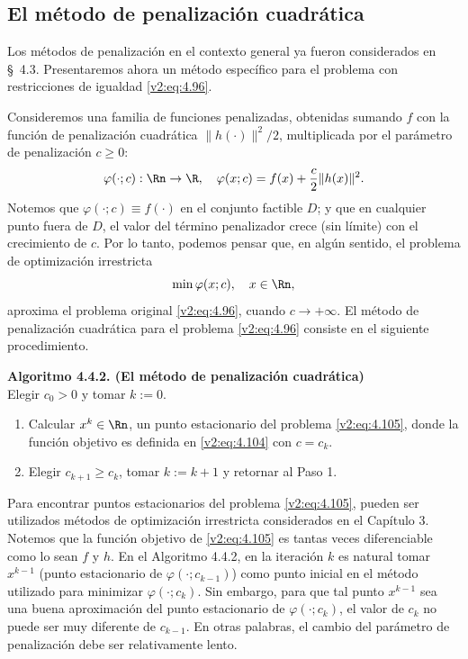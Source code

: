 \subsection{El método de penalización cuadrática}\label{v2:sec:4.4.2}

Los métodos de penalización en el contexto general ya fueron considerados en \S~4.3. Presentaremos ahora un método específico para el problema con restricciones de igualdad \eqref{v2:eq:4.96}.

Consideremos una familia de funciones penalizadas, obtenidas sumando $f$ con la función de penalización cuadrática $\|h(\cdot)\|^2/2$, multiplicada por el parámetro de penalización $c \ge 0$:
\begin{equation}
    \varphi(\cdot; c) : \Rn \to \R, \quad \varphi(x; c) = f(x) + \frac{c}{2}\|h(x)\|^2.
    \label{v2:eq:4.104}
\end{equation}
Notemos que $\varphi(\cdot; c) \equiv f(\cdot)$ en el conjunto factible $D$; y que en cualquier punto fuera de $D$, el valor del término penalizador crece (sin límite) con el crecimiento de $c$. Por lo tanto, podemos pensar que, en algún sentido, el problema de optimización irrestricta
\begin{equation}
    \min \varphi(x; c), \quad x \in \Rn,
    \label{v2:eq:4.105}
\end{equation}
aproxima el problema original \eqref{v2:eq:4.96}, cuando $c \to +\infty$. El método de penalización cuadrática para el problema \eqref{v2:eq:4.96} consiste en el siguiente procedimiento.

\vspace{0.3cm}
\noindent\textbf{Algoritmo 4.4.2. (El método de penalización cuadrática)}\\
Elegir $c_0 > 0$ y tomar $k:=0$.
\begin{enumerate}
    \item Calcular $x^k \in \Rn$, un punto estacionario del problema \eqref{v2:eq:4.105}, donde la función objetivo es definida en \eqref{v2:eq:4.104} con $c = c_k$.
    \item Elegir $c_{k+1} \ge c_k$, tomar $k:=k+1$ y retornar al Paso 1.
\end{enumerate}
\vspace{0.3cm}

Para encontrar puntos estacionarios del problema \eqref{v2:eq:4.105}, pueden ser utilizados métodos de optimización irrestricta considerados en el Capítulo 3. Notemos que la función objetivo de \eqref{v2:eq:4.105} es tantas veces diferenciable como lo sean $f$ y $h$. En el Algoritmo 4.4.2, en la iteración $k$ es natural tomar $x^{k-1}$ (punto estacionario de $\varphi(\cdot; c_{k-1})$) como punto inicial en el método utilizado para minimizar $\varphi(\cdot; c_k)$. Sin embargo, para que tal punto $x^{k-1}$ sea una buena aproximación del punto estacionario de $\varphi(\cdot; c_k)$, el valor de $c_k$ no puede ser muy diferente de $c_{k-1}$. En otras palabras, el cambio del parámetro de penalización debe ser relativamente lento.

